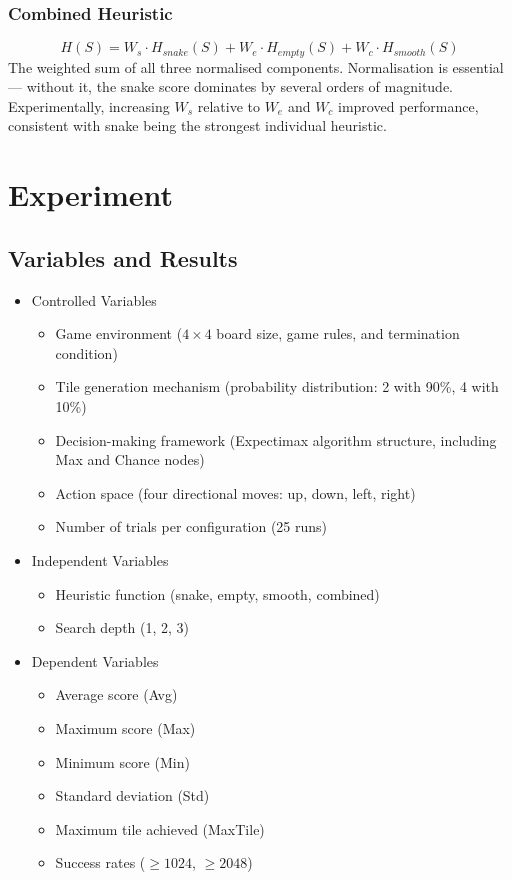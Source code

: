 \documentclass{article}
\begin{document}
\subsubsection{Combined Heuristic}
$$H(S) = W_s \cdot H_{snake}(S) + W_e \cdot H_{empty}(S) + W_c \cdot H_{smooth}(S)$$
The weighted sum of all three normalised components. Normalisation is essential — without it, the snake score
dominates by several orders of magnitude. Experimentally, increasing $W_s$ relative to $W_e$ and $W_c$
improved performance, consistent with snake being the strongest individual heuristic.

\section{Experiment}

\subsection{Variables and Results}

\begin{itemize}
  \item Controlled Variables
  \begin{itemize}
    \item Game environment ($4\times4$ board size, game rules, and termination condition)
    \item Tile generation mechanism (probability distribution: 2 with 90\%, 4 with 10\%)
    \item Decision-making framework (Expectimax algorithm structure, including Max and Chance nodes)
    \item Action space (four directional moves: up, down, left, right)
    \item Number of trials per configuration (25 runs)
  \end{itemize}
  \item Independent Variables
  \begin{itemize}
    \item Heuristic function (snake, empty, smooth, combined)
    \item Search depth (1, 2, 3)
  \end{itemize}
  \item Dependent Variables
  \begin{itemize}
    \item Average score (Avg)
    \item Maximum score (Max)
    \item Minimum score (Min)
    \item Standard deviation (Std)
    \item Maximum tile achieved (MaxTile)
    \item Success rates ($\ge1024$, $\ge2048$)
  \end{itemize}
\end{itemize}
\end{document}
